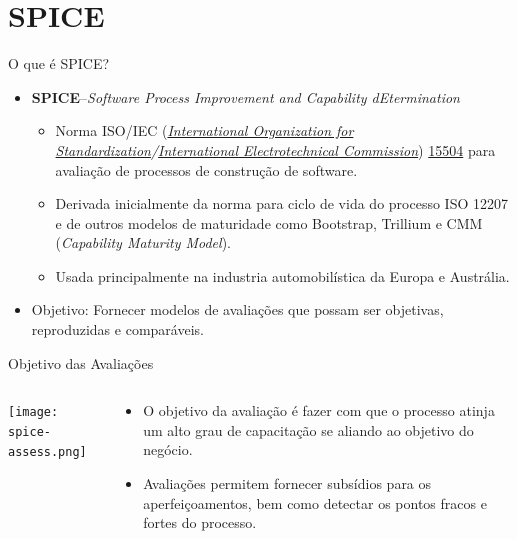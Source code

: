 
\frame{\maketitle}

\section{SPICE}

\begin{frame}{O que é SPICE?}
  \begin{itemize}[<+->]
  \item {\bf SPICE}--{\em Software Process Improvement and Capability dEtermination}
    \begin{itemize}[<+->]
    \item Norma ISO/IEC ({\em \href{International Electrotechnical
          Commission}{International Organization for
          Standardization}/\href{http://www.iec.ch/}{International
          Electrotechnical Commission}})
      \href{https://pt.wikipedia.org/wiki/ISO/IEC_15504}{15504} para
      avaliação de processos de construção de software.
    \item Derivada inicialmente da norma para ciclo de vida do
      processo ISO 12207 e de outros modelos de maturidade como
      Bootstrap, Trillium e CMM ({\em Capability Maturity Model}).
    \item Usada principalmente na industria automobilística da Europa e Austrália.
    \end{itemize}
  \item Objetivo: Fornecer modelos de avaliações que possam ser
    objetivas, reproduzidas e comparáveis.
  \end{itemize}  
\end{frame}

\begin{frame}{Objetivo das Avaliações}
  \begin{columns}
    \begin{column}{.3\textwidth}
      \texttt{[image: spice-assess.png]}      
    \end{column}
    \begin{column}{.7\textwidth}
      \begin{itemize}[<+->]
      \item O objetivo da avaliação é fazer com que o processo 
        atinja um alto grau de capacitação se aliando ao 
        objetivo do negócio.
      \item Avaliações permitem fornecer subsídios para os aperfeiçoamentos, 
        bem como detectar os pontos fracos e fortes do processo.
      \end{itemize}
    \end{column}
  \end{columns}
\end{frame}

